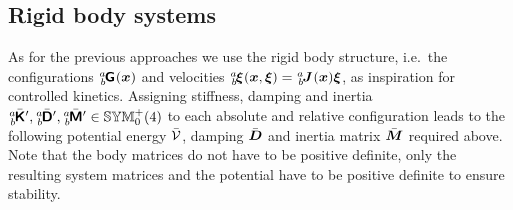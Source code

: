
\subsection{Rigid body systems}\label{sec:CtrlApproachEnergyRBS}
As for the previous approaches we use the rigid body structure, i.e.\ the configurations $\bodyHomoCoord{\BidxI}{\BidxII}(\sysCoord)$ and velocities $\bodyVel{\BidxI}{\BidxII}(\sysCoord, \sysVel) = \bodyJac{\BidxI}{\BidxII}(\sysCoord) \sysVel$, as inspiration for controlled kinetics.
Assigning stiffness, damping and inertia $\bodyStiffMatCp{\BidxI}{\BidxII}, \bodyDissMatCp{\BidxI}{\BidxII}, \bodyInertiaMatCp{\BidxI}{\BidxII} \in \SymMatSP(4)$ to each absolute and relative configuration leads to the following potential energy $\bar{\mathcal{V}}$, damping $\bar{\boldsymbol{D}}$ and inertia matrix $\bar{\boldsymbol{M}}$ required above.
Note that the body matrices do not have to be positive definite, only the resulting system matrices and the potential have to be positive definite to ensure stability.

